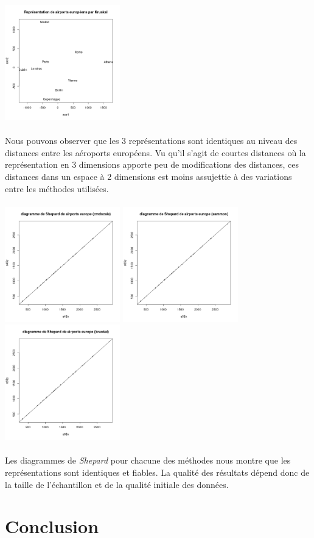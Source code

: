 \documentclass[a4paper, 10pt]{article}
\begin{document}
\includegraphics[height = 5cm, width = 5cm]{plots/plot_euro_kruskal.png}\\ \\
Nous pouvons observer que les 3 représentations sont identiques au niveau des distances entre les aéroports européens.
Vu qu'il s'agit de courtes distances où la représentation en 3 dimensions apporte peu de modifications des distances,
ces distances dans un espace à 2 dimensions est moins assujettie à des variations entre les méthodes utilisées.\\ \\
\includegraphics[height = 5cm, width = 5cm]{plots/plot_euro_shepard_cmdscale.png}
\includegraphics[height = 5cm, width = 5cm]{plots/plot_euro_shepard_sammon.png}
\includegraphics[height = 5cm, width = 5cm]{plots/plot_euro_shepard_kruskal.png}\\ \\
Les diagrammes de \textit{Shepard} pour chacune des méthodes nous montre que les représentations sont identiques et fiables.
La qualité des résultats dépend donc de la taille de l'échantillon et de la qualité initiale des données.

\section*{Conclusion}
\end{document}
